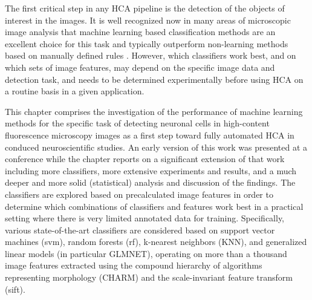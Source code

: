 The first critical step in any HCA pipeline is the detection of the objects of interest in the images. It is well recognized now in many areas of microscopic image analysis that machine learning based classification methods are an excellent choice for this task and typically outperform non-learning methods based on manually defined rules \cite{horvath2011machine, sommer2013machine, kraus2016computer, arganda2017trainable}. However, which classifiers work best, and on which sets of image features, may depend on the specific image data and detection task, and needs to be determined experimentally before using HCA on a routine basis in a given application.

This chapter comprises the investigation of the performance of machine learning methods for the specific task of detecting neuronal cells in high-content fluorescence microscopy images as a first step toward fully automated HCA in conduced neuroscientific studies. An early version of this work was presented at a conference \cite{mata2016automatic} while the chapter reports on a significant extension of that work including more classifiers, more extensive experiments and results, and a much deeper and more solid (statistical) analysis and discussion of the findings. The classifiers are explored based on precalculated image features in order to determine which combinations of classifiers and features work best in a practical setting where there is very limited annotated data for training. Specifically, various state-of-the-art classifiers are considered based on support vector machines (\gls{svm}), random forests (\gls{rf}), k-nearest neighbors (KNN), and generalized linear models (in particular GLMNET), operating on more than a thousand image features extracted using the compound hierarchy of algorithms representing morphology (CHARM) and the scale-invariant feature transform (\gls{sift}).
